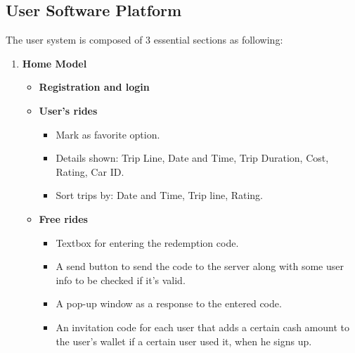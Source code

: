 \subsection{User Software Platform}
\hspace{2cm} The user system is composed of 3 essential sections as following:
\begin{enumerate}
    \item  {\textbf{Home Model}}
    \begin{itemize}
    \item {\textbf{Registration and login}}
    \item  {\textbf{User's rides}}
        \begin{itemize}
            \item Mark as favorite option.
            \item Details shown: Trip Line, Date and Time, Trip Duration, Cost, Rating, Car ID.
            \item Sort trips by: Date and Time, Trip line, Rating.
        \end{itemize}
    \item  {\textbf{Free rides}}
        \begin{itemize}
           \item Textbox for entering the redemption code.
           \item A send button to send the code to the server along with some user info to be checked if
it’s valid.
           \item A pop-up window as a response to the entered code.
          \item An invitation code for each user that adds a certain cash amount to the user’s wallet if a 
certain user used it, when he signs up.
        \end{itemize}
    

\end{itemize}
\end{enumerate}
